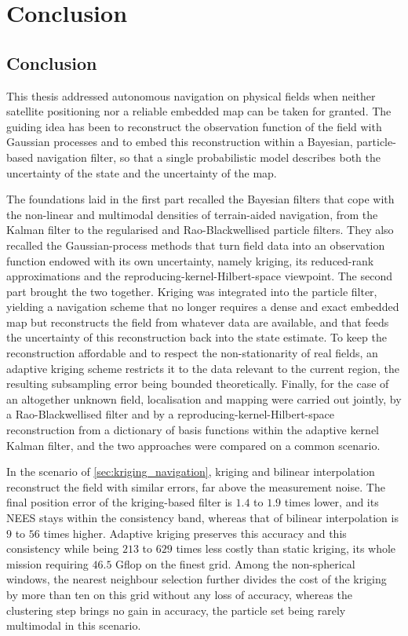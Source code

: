 \chapter{Conclusion}\label{sec:conclusion}

\section{Conclusion}

This thesis addressed autonomous navigation on physical fields when neither satellite positioning nor a reliable embedded map can be taken for granted. The guiding idea has been to reconstruct the observation function of the field with Gaussian processes and to embed this reconstruction within a Bayesian, particle-based navigation filter, so that a single probabilistic model describes both the uncertainty of the state and the uncertainty of the map.

The foundations laid in the first part recalled the Bayesian filters that cope with the non-linear and multimodal densities of terrain-aided navigation, from the Kalman filter to the regularised and Rao-Blackwellised particle filters. They also recalled the Gaussian-process methods that turn field data into an observation function endowed with its own uncertainty, namely kriging, its reduced-rank approximations and the reproducing-kernel-Hilbert-space viewpoint. The second part brought the two together. Kriging was integrated into the particle filter, yielding a navigation scheme that no longer requires a dense and exact embedded map but reconstructs the field from whatever data are available, and that feeds the uncertainty of this reconstruction back into the state estimate. To keep the reconstruction affordable and to respect the non-stationarity of real fields, an adaptive kriging scheme restricts it to the data relevant to the current region, the resulting subsampling error being bounded theoretically. Finally, for the case of an altogether unknown field, localisation and mapping were carried out jointly, by a Rao-Blackwellised filter and by a reproducing-kernel-Hilbert-space reconstruction from a dictionary of basis functions within the adaptive kernel Kalman filter, and the two approaches were compared on a common scenario.

In the scenario of \cref{sec:kriging_navigation}, kriging and bilinear interpolation reconstruct the field with similar errors, far above the measurement noise. The final position error of the kriging-based filter is $1.4$ to $1.9$ times lower, and its NEES stays within the consistency band, whereas that of bilinear interpolation is $9$ to $56$ times higher. Adaptive kriging preserves this accuracy and this consistency while being $213$ to $629$ times less costly than static kriging, its whole mission requiring $46.5$ Gflop on the finest grid. Among the non-spherical windows, the nearest neighbour selection further divides the cost of the kriging by more than ten on this grid without any loss of accuracy, whereas the clustering step brings no gain in accuracy, the particle set being rarely multimodal in this scenario.

